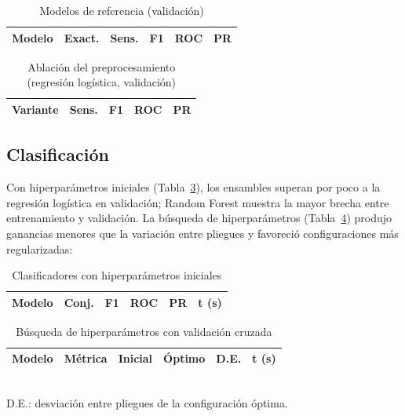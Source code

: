 \documentclass[conference,a4paper]{IEEEtran}
\begin{document}
\begin{table}[!t]
\centering
\caption{Modelos de referencia (validación)}
\label{tab:base}
\scriptsize
\setlength{\tabcolsep}{4pt}
\begin{tabular}{@{}lrrrrr@{}}
\toprule
\textbf{Modelo} & \textbf{Exact.} & \textbf{Sens.} & \textbf{F1} & \textbf{ROC} & \textbf{PR} \\
\midrule

\end{tabular}
\end{table}

\begin{table}[!t]
\centering
\caption{Ablación del preprocesamiento (regresión logística, validación)}
\label{tab:ablacion}
\scriptsize
\setlength{\tabcolsep}{4pt}
\begin{tabular}{@{}lrrrr@{}}
\toprule
\textbf{Variante} & \textbf{Sens.} & \textbf{F1} & \textbf{ROC} & \textbf{PR} \\
\midrule

\end{tabular}
\end{table}

\subsection{Clasificación}
Con hiperparámetros iniciales (Tabla~\ref{tab:inicial}), los ensambles superan por poco a la regresión logística en validación; Random Forest muestra la mayor brecha entre entrenamiento y validación. La búsqueda de hiperparámetros (Tabla~\ref{tab:hiper}) produjo ganancias menores que la variación entre pliegues y favoreció configuraciones más regularizadas:
\begin{itemize}

\end{itemize}

\begin{table}[!t]
\centering
\caption{Clasificadores con hiperparámetros iniciales}
\label{tab:inicial}
\scriptsize
\setlength{\tabcolsep}{4pt}
\begin{tabular}{@{}llrrrr@{}}
\toprule
\textbf{Modelo} & \textbf{Conj.} & \textbf{F1} & \textbf{ROC} & \textbf{PR} & \textbf{t (s)} \\
\midrule

\end{tabular}
\end{table}

\begin{table}[!t]
\centering
\caption{Búsqueda de hiperparámetros con validación cruzada}
\label{tab:hiper}
\scriptsize
\setlength{\tabcolsep}{4pt}
\begin{tabular}{@{}llrrrr@{}}
\toprule
\textbf{Modelo} & \textbf{Métrica} & \textbf{Inicial} & \textbf{Óptimo} & \textbf{D.E.} & \textbf{t (s)} \\
\midrule

\end{tabular}\\[2pt]
{\footnotesize D.E.: desviación entre pliegues de la configuración óptima.}
\end{table}
\end{document}
